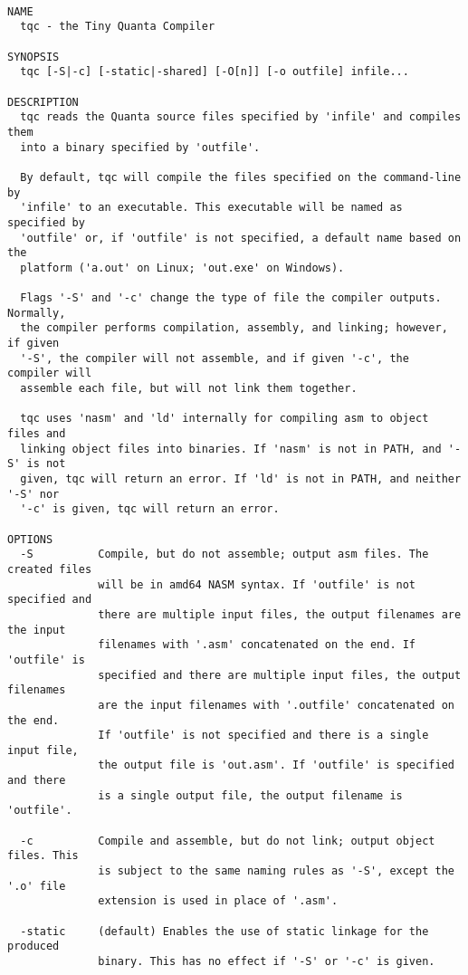 \documentclass[9pt]{extarticle}
\begin{document}
\begin{verbatim}

NAME
  tqc - the Tiny Quanta Compiler

SYNOPSIS
  tqc [-S|-c] [-static|-shared] [-O[n]] [-o outfile] infile...

DESCRIPTION
  tqc reads the Quanta source files specified by 'infile' and compiles them
  into a binary specified by 'outfile'.

  By default, tqc will compile the files specified on the command-line by
  'infile' to an executable. This executable will be named as specified by
  'outfile' or, if 'outfile' is not specified, a default name based on the
  platform ('a.out' on Linux; 'out.exe' on Windows).

  Flags '-S' and '-c' change the type of file the compiler outputs.  Normally,
  the compiler performs compilation, assembly, and linking; however, if given
  '-S', the compiler will not assemble, and if given '-c', the compiler will
  assemble each file, but will not link them together.

  tqc uses 'nasm' and 'ld' internally for compiling asm to object files and
  linking object files into binaries. If 'nasm' is not in PATH, and '-S' is not
  given, tqc will return an error. If 'ld' is not in PATH, and neither '-S' nor
  '-c' is given, tqc will return an error.

OPTIONS
  -S          Compile, but do not assemble; output asm files. The created files
              will be in amd64 NASM syntax. If 'outfile' is not specified and
              there are multiple input files, the output filenames are the input
              filenames with '.asm' concatenated on the end. If 'outfile' is
              specified and there are multiple input files, the output filenames
              are the input filenames with '.outfile' concatenated on the end.
              If 'outfile' is not specified and there is a single input file,
              the output file is 'out.asm'. If 'outfile' is specified and there
              is a single output file, the output filename is 'outfile'.

  -c          Compile and assemble, but do not link; output object files. This
              is subject to the same naming rules as '-S', except the '.o' file
              extension is used in place of '.asm'.

  -static     (default) Enables the use of static linkage for the produced
              binary. This has no effect if '-S' or '-c' is given.


\end{verbatim}
\end{document}
